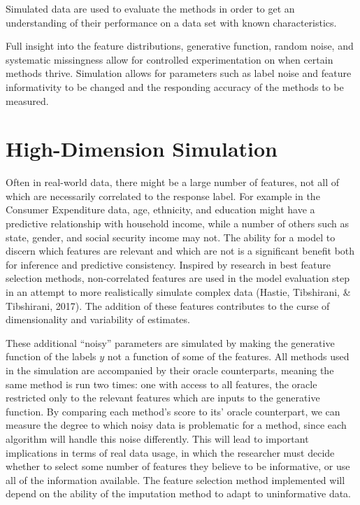 \documentclass[12pt,twoside]{reedthesis}
\begin{document}
Simulated data are used to evaluate the methods in order to get an
understanding of their performance on a data set with known
characteristics.

Full insight into the feature distributions, generative function, random
noise, and systematic missingness allow for controlled experimentation
on when certain methods thrive. Simulation allows for parameters such as
label noise and feature informativity to be changed and the responding
accuracy of the methods to be measured.

\section{High-Dimension Simulation}\label{high-dimension-simulation}

Often in real-world data, there might be a large number of features, not
all of which are necessarily correlated to the response label. For
example in the Consumer Expenditure data, age, ethnicity, and education
might have a predictive relationship with household income, while a
number of others such as state, gender, and social security income may
not. The ability for a model to discern which features are relevant and
which are not is a significant benefit both for inference and predictive
consistency. Inspired by research in best feature selection methods,
non-correlated features are used in the model evaluation step in an
attempt to more realistically simulate complex data (Hastie, Tibshirani,
\& Tibshirani, 2017). The addition of these features contributes to the
curse of dimensionality and variability of estimates.

These additional ``noisy'' parameters are simulated by making the
generative function of the labels \(y\) not a function of some of the
features. All methods used in the simulation are accompanied by their
oracle counterparts, meaning the same method is run two times: one with
access to all features, the oracle restricted only to the relevant
features which are inputs to the generative function. By comparing each
method's score to its' oracle counterpart, we can measure the degree to
which noisy data is problematic for a method, since each algorithm will
handle this noise differently. This will lead to important implications
in terms of real data usage, in which the researcher must decide whether
to select some number of features they believe to be informative, or use
all of the information available. The feature selection method
implemented will depend on the ability of the imputation method to adapt
to uninformative data.
\end{document}
